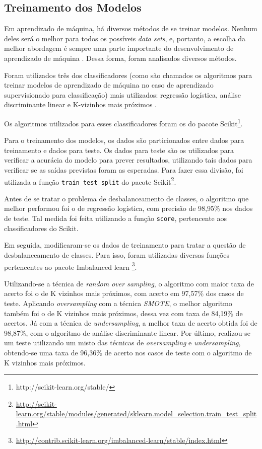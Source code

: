 		\subsection{Treinamento dos Modelos}

			Em aprendizado de máquina, há diversos métodos de se treinar modelos. Nenhum deles será o melhor para todos os possíveis \emph{data sets}, e, portanto, a escolha da melhor abordagem é sempre uma parte importante do desenvolvimento de aprendizado de máquina \cite{islr}. Dessa forma, foram analisados diversos métodos.

			Foram utilizados três dos classificadores (como são chamados os algoritmos para treinar modelos de aprendizado de máquina no caso de aprendizado supervisionado para classificação) mais utilizados: regressão logística, análise discriminante linear e K-vizinhos mais próximos \cite{islr}.

			Os algoritmos utilizados para esses classificadores foram os do pacote Scikit\footnote{http://scikit-learn.org/stable/}.

			Para o treinamento dos modelos, os dados são particionados entre dados para treinamento e dados para teste. Os dados para teste são os utilizados para verificar a acurácia do modelo para prever resultados, utilizando tais dados para verificar se as saídas previstas foram as esperadas. Para fazer essa divisão, foi utilizada a função \texttt{train\_test\_split} do pacote Scikit\footnote{\url{http://scikit-learn.org/stable/modules/generated/sklearn.model_selection.train_test_split.html}}.

			Antes de se tratar o problema de desbalanceamento de classes, o algoritmo que melhor performou foi o de regressão logística, com precisão de 98,95\% nos dados de teste. Tal medida foi feita utilizando a função \texttt{score}, pertencente aos classificadores do Scikit.

			Em seguida, modificaram-se os dados de treinamento para tratar a questão de desbalanceamento de classes. Para isso, foram utilizadas diversas funções pertencentes ao pacote Imbalanced learn \footnote{\url{http://contrib.scikit-learn.org/imbalanced-learn/stable/index.html}}.

			Utilizando-se a técnica de \emph{random over sampling}, o algoritmo com maior taxa de acerto foi o de K vizinhos mais próximos, com acerto em 97,57\% dos casos de teste. Aplicando \emph{oversampling} com a técnica \emph{SMOTE}, o melhor algoritmo também foi o de K vizinhos mais próximos, dessa vez com taxa de 84,19\% de acertos. Já com a técnica de \emph{undersampling}, a melhor taxa de acerto obtida foi de 98,87\%, com o algoritmo de análise discriminante linear. Por último, realizou-se um teste utilizando um misto das técnicas de \emph{oversampling} e \emph{undersampling}, obtendo-se uma taxa de 96,36\% de acerto nos casos de teste com o algoritmo de K vizinhos mais próximos.

